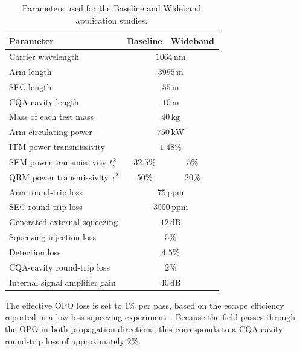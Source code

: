 \documentclass{iopjournal}
\begin{document}
\begin{table}[htbp]
    \centering
    \caption{
    Parameters used for the Baseline and Wideband application studies.
    }
    \label{tab:application_parameters}
    \begin{tabular}{lcc}
    \hline
    Parameter
        & Baseline
        & Wideband \\
    \hline
    Carrier wavelength
        & \multicolumn{2}{c}{\(1064\,\mathrm{nm}\)} \\
    Arm length
        & \multicolumn{2}{c}{\(3995\,\mathrm{m}\)} \\
    SEC length
        & \multicolumn{2}{c}{\(55\,\mathrm{m}\)} \\
    CQA cavity length
        & \multicolumn{2}{c}{\(10\,\mathrm{m}\)} \\
    Mass of each test mass
        & \multicolumn{2}{c}{\(40\,\mathrm{kg}\)} \\
    Arm circulating power
        & \multicolumn{2}{c}{\(750\,\mathrm{kW}\)} \\
    ITM power transmissivity
        & \multicolumn{2}{c}{\(1.48\%\)} \\
    SEM power transmissivity \(t_{\rm s}^2\)
        & \(32.5\%\)
        & \(5\%\) \\
    QRM power transmissivity \(\tau^2\)
        & \(50\%\)
        & \(20\%\) \\
    Arm round-trip loss
        & \multicolumn{2}{c}{\(75\,\mathrm{ppm}\)} \\
    SEC round-trip loss
        & \multicolumn{2}{c}{\(3000\,\mathrm{ppm}\)} \\
    Generated external squeezing
        & \multicolumn{2}{c}{\(12\,\mathrm{dB}\)} \\
    Squeezing injection loss
        & \multicolumn{2}{c}{\(5\%\)} \\
    Detection loss
        & \multicolumn{2}{c}{\(4.5\%\)} \\
    CQA-cavity round-trip loss
        & \multicolumn{2}{c}{\(2\%\)} \\
    Internal signal amplifier gain
        & \multicolumn{2}{c}{\(40\,\mathrm{dB}\)} \\
    \hline
    \end{tabular}
\end{table}


The effective OPO loss is set to \(1\%\) per pass, based on the escape efficiency reported in a low-loss squeezing experiment~\cite{Vahlbruch2016SqueezedStates}. Because the field passes through the OPO in both propagation directions, this corresponds to a CQA-cavity round-trip loss of approximately \(2\%\).
\end{document}
